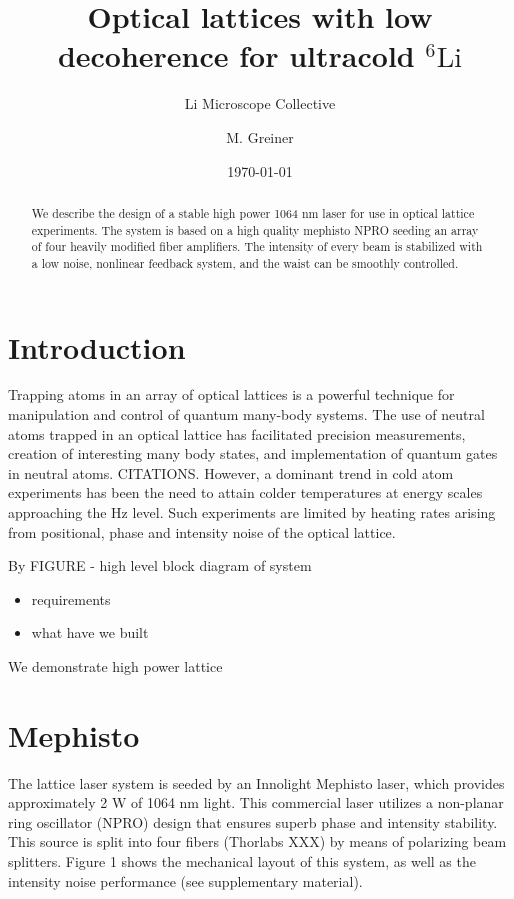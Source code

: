 \documentclass[twocolumn,aps,pra,showpacs,preprintnumbers,bibnotes]{revtex4-1}
\newcommand\Isotope[2]{\ensuremath{^{#1}\mathrm{#2}}}
\newcommand\Li{\Isotope{6}{Li}}
\begin{document}
\title{Optical lattices with low decoherence for ultracold \Li{}}


\author{Li Microscope Collective}
\author{M. Greiner}

\date{\today}
\begin{abstract}
We describe the design of a stable high power 1064 nm laser for use in optical lattice experiments. The system is based on a high quality mephisto NPRO seeding an array of four heavily modified fiber amplifiers. The intensity of every beam is stabilized with a low noise, nonlinear feedback system, and the waist can be smoothly controlled. 
\end{abstract}
\maketitle
\section{Introduction}
Trapping atoms in an array of optical lattices is a powerful technique for manipulation and control of quantum many-body systems. 
The use of neutral atoms trapped in an optical lattice has facilitated precision measurements, creation of interesting many body states, and implementation of quantum gates in neutral atoms. CITATIONS.
However, a dominant trend in cold atom experiments has been the need to attain colder temperatures at energy scales approaching the Hz level.
Such experiments are limited by heating rates arising from positional, phase and intensity noise of the optical lattice. 

By FIGURE - high level block diagram of system

\begin{itemize}
	\item requirements 
	\item what have we built
\end{itemize}

We demonstrate high power lattice 


\section{Mephisto}
The lattice laser system is seeded by an Innolight Mephisto laser, which provides approximately 2 W of 1064 nm light. 
This commercial laser utilizes a non-planar ring oscillator (NPRO) design that ensures superb phase and intensity stability. This source is split into four fibers (Thorlabs XXX) by means of polarizing beam splitters. Figure 1 shows the mechanical layout of this system, as well as the intensity noise performance (see supplementary material).
\end{document}
